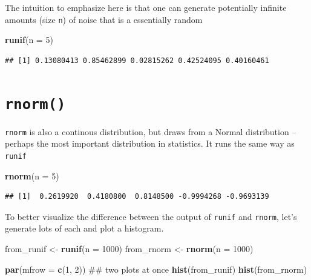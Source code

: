 \documentclass[]{book}
\newenvironment{Shaded}{\begin{snugshade}}{\end{snugshade}}
\newcommand{\KeywordTok}[1]{\textcolor[rgb]{0.13,0.29,0.53}{\textbf{#1}}}
\newcommand{\DataTypeTok}[1]{\textcolor[rgb]{0.13,0.29,0.53}{#1}}
\newcommand{\DecValTok}[1]{\textcolor[rgb]{0.00,0.00,0.81}{#1}}
\newcommand{\StringTok}[1]{\textcolor[rgb]{0.31,0.60,0.02}{#1}}
\newcommand{\NormalTok}[1]{#1}
\theoremstyle{definition}
\theoremstyle{definition}
\theoremstyle{definition}
\theoremstyle{remark}
\begin{document}
The intuition to emphasize here is that one can generate potentially
infinite amounts (size \texttt{n}) of noise that is a essentially random

\begin{Shaded}
\begin{Highlighting}[]
\KeywordTok{runif}\NormalTok{(}\DataTypeTok{n =} \DecValTok{5}\NormalTok{)}
\end{Highlighting}
\end{Shaded}

\begin{verbatim}
## [1] 0.13080413 0.85462899 0.02815262 0.42524095 0.40160461
\end{verbatim}

\section{\texorpdfstring{\texttt{rnorm()}}{rnorm()}}\label{rnorm}

\texttt{rnorm} is also a continous distribution, but draws from a Normal
distribution -- perhaps the most important distribution in statistics.
It runs the same way as \texttt{runif}

\begin{Shaded}
\begin{Highlighting}[]
\KeywordTok{rnorm}\NormalTok{(}\DataTypeTok{n =} \DecValTok{5}\NormalTok{)}
\end{Highlighting}
\end{Shaded}

\begin{verbatim}
## [1]  0.2619920  0.4180800  0.8148500 -0.9994268 -0.9693139
\end{verbatim}

To better visualize the difference between the output of \texttt{runif}
and \texttt{rnorm}, let's generate lots of each and plot a histogram.

\begin{Shaded}
\begin{Highlighting}[]
\NormalTok{from_runif <-}\StringTok{ }\KeywordTok{runif}\NormalTok{(}\DataTypeTok{n =} \DecValTok{1000}\NormalTok{)}
\NormalTok{from_rnorm <-}\StringTok{ }\KeywordTok{rnorm}\NormalTok{(}\DataTypeTok{n =} \DecValTok{1000}\NormalTok{)}

\KeywordTok{par}\NormalTok{(}\DataTypeTok{mfrow =} \KeywordTok{c}\NormalTok{(}\DecValTok{1}\NormalTok{, }\DecValTok{2}\NormalTok{)) ## two plots at once}
\KeywordTok{hist}\NormalTok{(from_runif)}
\KeywordTok{hist}\NormalTok{(from_rnorm)}
\end{Highlighting}
\end{Shaded}
\end{document}
